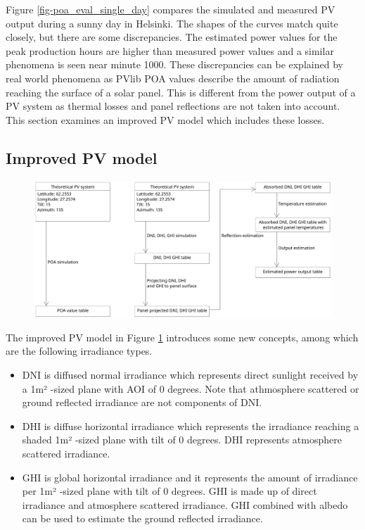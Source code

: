 \noindent Figure \ref{fig-poa_eval_single_day} compares the simulated and measured PV output during a sunny day in Helsinki. The shapes of the curves match quite closely, but there are some discrepancies. The estimated power values for the peak production hours are higher than measured power values and a similar phenomena is seen near minute 1000. These discrepancies can be explained by real world phenomena as PVlib POA values describe the amount of radiation reaching the surface of a solar panel. This is different from the power output of a PV system as thermal losses and panel reflections are not taken into account. This section examines an improved PV model which includes these losses.

\newpage

\subsection{Improved PV model}

\begin{figure}[h]
\centering
\includegraphics[width=1.0\linewidth]{pics/uml2}
\label{fig-pv_model}
\end{figure}


\noindent 
The improved PV model in Figure \ref{fig-pv_model} introduces some new concepts, among which are the following irradiance types.

\begin{itemize}
\item DNI is diffused normal irradiance which represents direct sunlight received by a 1m² -sized plane with AOI of 0 degrees. Note that athmosphere scattered or ground reflected irradiance are not components of DNI.

\item DHI is diffuse horizontal irradiance which represents the irradiance reaching a shaded 1m² -sized plane with tilt of 0 degrees. DHI represents atmosphere scattered irradiance.

\item GHI is global horizontal irradiance and it represents the amount of irradiance per 1m² -sized plane with tilt of 0 degrees. GHI is made up of direct irradiance and atmosphere scattered irradiance. GHI combined with albedo can be used to estimate the ground reflected irradiance.
\end{itemize}

